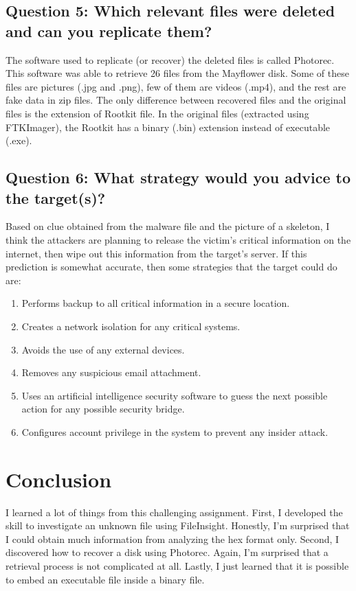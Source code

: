 \documentclass[letterpaper,10pt,titlepage,draftclsnofoot,onecolumn]{IEEEtran}
\begin{document}
\subsection{Question 5: Which relevant files were deleted and can you replicate them?}

The software used to replicate (or recover) the deleted files is called Photorec.
This software was able to retrieve 26 files from the Mayflower disk.
Some of these files are pictures (.jpg and .png), few of them are videos (.mp4), and the rest are fake data in zip files. 
The only difference between recovered files and the original files is the extension of Rootkit file. 
In the original files (extracted using FTKImager), the Rootkit has a binary (.bin) extension instead of executable (.exe).

\subsection{Question 6: What strategy would you advice to the target(s)?}

Based on clue obtained from the malware file and the picture of a skeleton, I think the attackers are planning to release the victim's critical information on the internet, then wipe out this information from the target's server. 
If this prediction is somewhat accurate, then some strategies that the target could do are:
    \begin{enumerate}
    \item Performs backup to all critical information in a secure location.
    \item Creates a network isolation for any critical systems.
    \item Avoids the use of any external devices.
    \item Removes any suspicious email attachment.
    \item Uses an artificial intelligence security software to guess the next possible action for any possible security bridge.
    \item Configures account privilege in the system to prevent any insider attack.
    \end{enumerate}

\section{Conclusion}

I learned a lot of things from this challenging assignment. 
First, I developed the skill to investigate an unknown file using FileInsight. 
Honestly, I'm surprised that I could obtain much information from analyzing the hex format only. 
Second, I discovered how to recover a disk using Photorec.
Again, I'm surprised that a retrieval process is not complicated at all.
Lastly, I just learned that it is possible to embed an executable file inside a binary file.
\end{document}
